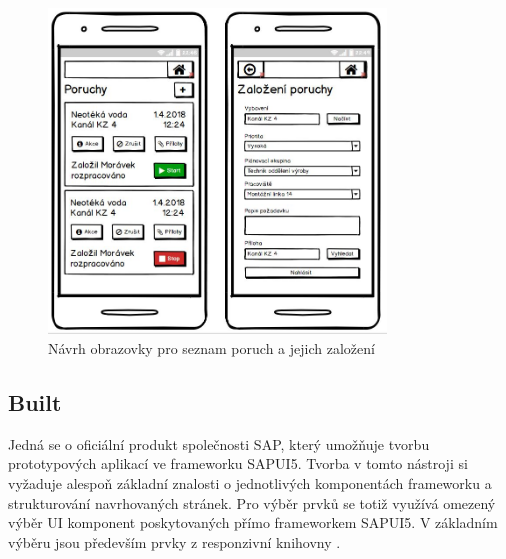 \documentclass[thesis=M,czech]{FITthesis}[2012/06/26]
\begin{document}
\begin{figure}[H]
	\centering
	\includegraphics[width=0.8\textwidth]{images/bal_poruchy_mob}
	\caption{Návrh obrazovky pro seznam poruch a jejich založení}
	\label{img:bal_poruchy_mob}
\end{figure}

\subsection{Built}
Jedná se o oficiální produkt společnosti SAP, který umožňuje tvorbu prototypových aplikací ve frameworku SAPUI5. Tvorba v tomto nástroji si vyžaduje alespoň základní znalosti o jednotlivých komponentách frameworku a strukturování navrhovaných stránek. Pro výběr prvků se totiž využívá omezený výběr UI komponent poskytovaných přímo frameworkem SAPUI5. V základním výběru jsou především prvky z responzivní knihovny .
\end{document}
